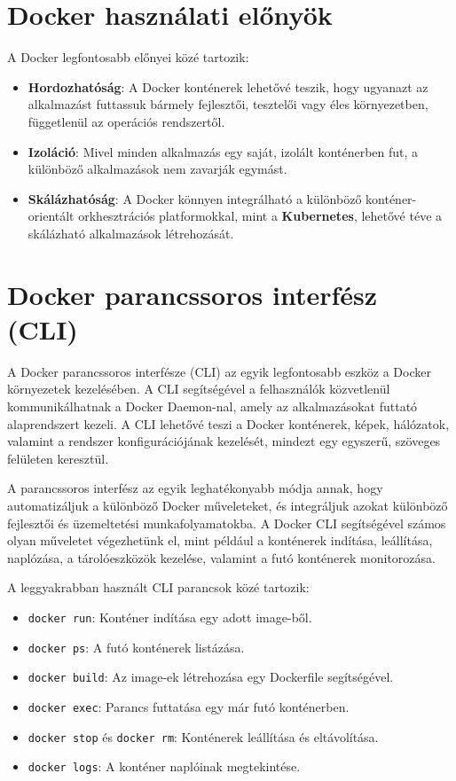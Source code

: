 \section{Docker használati előnyök}

A Docker legfontosabb előnyei közé tartozik:

\begin{itemize}
	\item \textbf{Hordozhatóság}: A Docker konténerek lehetővé teszik, hogy ugyanazt az alkalmazást futtassuk bármely fejlesztői, tesztelői vagy éles környezetben, függetlenül az operációs rendszertől.
	\item \textbf{Izoláció}: Mivel minden alkalmazás egy saját, izolált konténerben fut, a különböző alkalmazások nem zavarják egymást.
	\item \textbf{Skálázhatóság}: A Docker könnyen integrálható a különböző konténer-orientált orkhesztrációs platformokkal, mint a \textbf{Kubernetes}, lehetővé téve a skálázható alkalmazások létrehozását.
\end{itemize}

\section{Docker parancssoros interfész (CLI)}

A Docker parancssoros interfésze (CLI) az egyik legfontosabb eszköz a Docker környezetek kezelésében. A CLI segítségével a felhasználók közvetlenül kommunikálhatnak a Docker Daemon-nal, amely az alkalmazásokat futtató alaprendszert kezeli. A CLI lehetővé teszi a Docker konténerek, képek, hálózatok, valamint a rendszer konfigurációjának kezelését, mindezt egy egyszerű, szöveges felületen keresztül.

A parancssoros interfész az egyik leghatékonyabb módja annak, hogy automatizáljuk a különböző Docker műveleteket, és integráljuk azokat különböző fejlesztői és üzemeltetési munkafolyamatokba. A Docker CLI segítségével számos olyan műveletet végezhetünk el, mint például a konténerek indítása, leállítása, naplózása, a tárolóeszközök kezelése, valamint a futó konténerek monitorozása.

A leggyakrabban használt CLI parancsok közé tartozik:

\begin{itemize}
	\item \texttt{docker run}: Konténer indítása egy adott image-ből.
	\item \texttt{docker ps}: A futó konténerek listázása.
	\item \texttt{docker build}: Az image-ek létrehozása egy Dockerfile segítségével.
	\item \texttt{docker exec}: Parancs futtatása egy már futó konténerben.
	\item \texttt{docker stop} és \texttt{docker rm}: Konténerek leállítása és eltávolítása.
	\item \texttt{docker logs}: A konténer naplóinak megtekintése.
\end{itemize}

